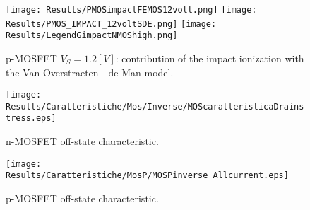 \begin{figure}[!h]
\vspace{0.5cm}
\centering
{\texttt{[image: Results/PMOSimpactFEMOS12volt.png]}}
\hspace{0.04\textwidth}
{\texttt{[image: Results/PMOS\_IMPACT\_12voltSDE.png]}}
\hspace{0.04\textwidth}
{\texttt{[image: Results/LegendGimpactNMOShigh.png]}}
\caption{p-MOSFET $V_S=1.2[V]$: contribution of the impact ionization with the Van Overstraeten - de Man model.}
\label{fig: II pMOS high}
\vspace{0.5cm}
\end{figure}







\begin{figure}[!h]
\texttt{[image: Results/Caratteristiche/Mos/Inverse/MOScaratteristicaDrainstress.eps]}
\caption{n-MOSFET off-state characteristic.}
\label{fig: tutte le correnti mos stress}
\end{figure}



\vspace{1cm}



\begin{figure}[!h]
\texttt{[image: Results/Caratteristiche/MosP/MOSPinverse\_Allcurrent.eps]}
\caption{p-MOSFET off-state characteristic.}
\label{fig: tutte le correnti Pmos stress}
\end{figure}








